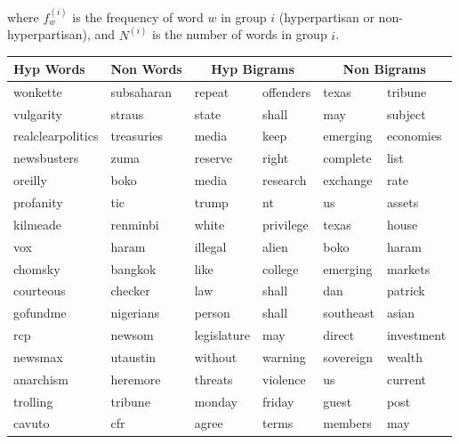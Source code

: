 \documentclass[11pt,a4paper]{article}
\begin{document}
where $f_w^{(i)}$ is the frequency of word $w$ in group $i$ (hyperpartisan or non-hyperpartisan), and $N^{(i)}$ is the number of words in group $i$.

\begin{table}[ht]
\centering
\begin{tabular}{l|l|ll|ll}
\toprule
Hyp Words        & Non Words         & \multicolumn{2}{c}{Hyp Bigrams}  & \multicolumn{2}{c}{Non Bigrams}   \\ \midrule
wonkette          & subsaharan        & repeat      & offenders   & texas         & tribune      \\
vulgarity         & straus            & state       & shall       & may           & subject      \\
realclearpolitics & treasuries        & media       & keep        & emerging      & economies    \\
newsbusters       & zuma              & reserve     & right       & complete      & list         \\
oreilly           & boko              & media       & research    & exchange      & rate         \\
profanity         & tic               & trump       & nt          & us            & assets       \\
kilmeade          & renminbi          & white       & privilege   & texas         & house        \\
vox               & haram             & illegal     & alien       & boko          & haram        \\
chomsky           & bangkok           & like        & college     & emerging      & markets      \\
courteous         & checker           & law         & shall       & dan           & patrick      \\
gofundme          & nigerians         & person      & shall       & southeast     & asian        \\
rcp               & newsom            & legislature & may         & direct        & investment   \\
newsmax           & utaustin          & without     & warning     & sovereign     & wealth       \\
anarchism         & heremore          & threats     & violence    & us            & current      \\
trolling          & tribune           & monday      & friday      & guest         & post         \\
cavuto            & cfr               & agree       & terms       & members       & may          \\

\end{tabular}
\end{table}
\end{document}
